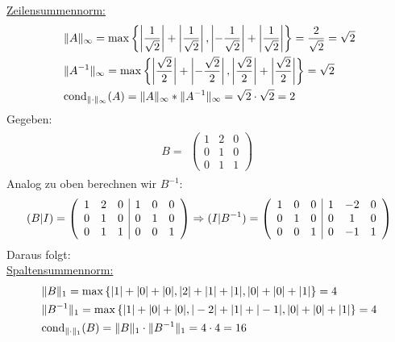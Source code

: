\underline{Zeilensummennorm:}
\begin{align*}
\begin{split}
&\|A\|_\infty =\max\left\lbrace\left|\frac{1}{\sqrt2}\right|+\left|\frac{1}{\sqrt2}\right|, \left|-\frac{1}{\sqrt2}\right|+\left|\frac{1}{\sqrt2}\right|\right\rbrace= \frac{2}{\sqrt{2}} = \sqrt{2}\\
&\|A^{-1}\|_\infty=\max\left\lbrace\left|\frac{\sqrt2}{2}\right|+\left|-\frac{\sqrt2}{2}\right|, \left|\frac{\sqrt2}{2}\right|+\left|\frac{\sqrt2}{2}\right|\right\rbrace={\sqrt2}\\
& \mathrm{cond}_{\| \cdot \|_\infty}(A)=\|A\|_\infty*\|A^{-1}\|_\infty=  {\sqrt{2}} \cdot  {\sqrt{2}}  = 2 \\
\end{split}
\end{align*}
\newline
Gegeben:\\
\begin{align*}
B=
\begin{split}
\begin{pmatrix}
1 & 2 & 0 \\
0 & 1 & 0 \\
0 & 1 & 1
\end{pmatrix}
\end{split}
\end{align*}
Analog zu oben berechnen wir $B^{-1}$:\\
\begin{align*}
(B|I)=
\begin{split}
\begin{array}({ccc|ccc})
1 & 2 & 0 & 1 & 0 & 0\\
0 & 1 & 0 & 0 & 1 & 0\\
0 & 1 & 1 & 0 & 0 & 1
\end{array}
\Rightarrow(I|B^{-1})=
\begin{array}({ccc|ccc})
1 & 0 & 0 &1 & -2 & 0 \\
0 & 1 & 0 &0 & 1 & 0 \\
0 & 0 & 1 &0 & -1 & 1
\end{array}
\end{split}
\end{align*}
Daraus folgt:\\
\underline{Spaltensummennorm:}
\begin{align*}
\begin{split}
&\|B\|_1=\mathrm{max} \left\lbrace|1|+|0|+|0|, |2|+|1|+|1|, |0|+|0|+|1|\right\rbrace = 4\\
&\|B^{-1}\|_1=\mathrm{max} \left\lbrace|1|+|0|+|0|, |-2|+|1|+|-1|, |0|+|0|+|1|\right\rbrace = 4\\
&\mathrm{cond}_{\| \cdot \|_1}(B)=\|B\|_1\cdot\|B^{-1}\|_1= 4 \cdot 4 = 16\\
\end{split}
\end{align*}
